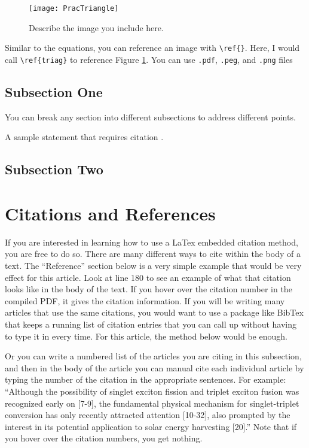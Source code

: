 \documentclass[twoside,twocolumn]{article}
\begin{document}
\begin{figure}[htbp]
\begin{center}
\texttt{[image: PracTriangle]}
\caption{Describe the image you include here.}
\label{triag}
\end{center}
\end{figure}

Similar to the equations, you can reference an image with \verb|\ref{}|. Here, I would call \verb|\ref{triag}| to reference Figure \ref{triag}. You can use \texttt{.pdf}, \texttt{.peg}, and \texttt{.png} files 

\subsection{Subsection One}
You can break any section into different subsections to address different points. 

A sample statement that requires citation \cite{Figueredo:2009dg}.

\blindtext %

\subsection{Subsection Two}

\blindtext %

\section{Citations and References}

If you are interested in learning how to use a LaTex embedded citation method, you are free to do so. There are many different ways to cite within the body of a text. The ``Reference'' section below is a very simple example that would be very effect for this article. Look at line 180 to see an example of what that citation looks like in the body of the text. If you hover over the citation number in the compiled PDF, it gives the citation information. If you will be writing many articles that use the same citations, you would want to use a package like BibTex that keeps a running list of citation entries that you can call up without having to type it in every time. For this article, the method below would be enough.

Or you can write a numbered list of the articles you are citing in this subsection, and then in the body of the article you can manual cite each individual article by typing the number of the citation in the appropriate sentences. For example: ``Although the possibility of singlet exciton fission and triplet exciton fusion was recognized early on [7-9], the fundamental physical mechanism for singlet-triplet conversion has only recently attracted attention [10-32], also prompted by the interest in its potential application to solar energy harvesting [20].'' Note that if you hover over the citation numbers, you get nothing.
\end{document}
